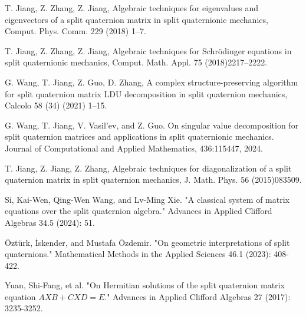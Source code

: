 \documentclass[preprint,12pt]{elsarticle}
\numberwithin{equation}{section}
\begin{document}
\begin{thebibliography}{99}
T. Jiang, Z. Zhang, Z. Jiang, Algebraic techniques for eigenvalues and eigenvectors of a split quaternion matrix in split quaternionic mechanics,
Comput. Phys. Comm. 229 (2018) 1–7.

T. Jiang, Z. Zhang, Z. Jiang, Algebraic techniques for Schrödinger equations in split quaternionic mechanics, Comput. Math. Appl. 75 (2018)2217–2222.

G. Wang, T. Jiang, Z. Guo, D. Zhang, A complex structure-preserving algorithm for split quaternion matrix LDU decomposition in split quaternion
mechanics, Calcolo 58 (34) (2021) 1–15.

G. Wang, T. Jiang, V. Vasil'ev, and Z. Guo. On singular value decomposition
for split quaternion matrices and applications in split quaternionic mechanics. Journal of
Computational and Applied Mathematics, 436:115447, 2024.

 T. Jiang, Z. Jiang, Z. Zhang, Algebraic techniques for diagonalization of a split quaternion matrix in split quaternion mechanics, J. Math. Phys. 56 (2015)083509.

Si, Kai-Wen, Qing-Wen Wang, and Lv-Ming Xie. "A classical system of matrix equations over the split quaternion algebra." Advances in Applied Clifford Algebras 34.5 (2024): 51.

Öztürk, İskender, and Mustafa Özdemir. "On geometric interpretations of split quaternions." Mathematical Methods in the Applied Sciences 46.1 (2023): 408-422.

Yuan, Shi-Fang, et al. "On Hermitian solutions of the split quaternion matrix equation $AXB+CXD=E$." Advances in Applied Clifford Algebras 27 (2017): 3235-3252.
\end{thebibliography}
\end{document}
